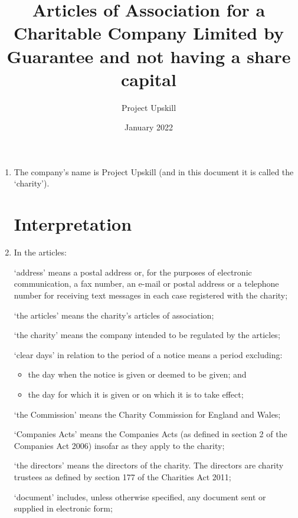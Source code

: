 \documentclass{article}
\title{Articles of Association for a Charitable Company Limited by Guarantee and not having a share capital}
\author{Project Upskill}
\date{January 2022}
\begin{document}
\maketitle
\tableofcontents
\newpage
\begin{enumerate}[label=\arabic*]
    \section{Articles of Association of Project Upskill}
    \item The company's name is Project Upskill (and in this document it is called the `charity').
    
    \section{Interpretation}
    \item In the articles:
    
    `address' means a postal address or, for the purposes of electronic
    communication, a fax number, an e-mail or postal address or a
    telephone number for receiving text messages in each case registered
    with the charity;
    
    `the articles' means the charity's articles of association;
    
    `the charity' means the company intended to be regulated by
    the articles;
    
    `clear days' in relation to the period of a notice means a
    period excluding:
    \begin{itemize}
        \item the day when the notice is given or deemed to be given; and
        \item the day for which it is given or on which it is to take effect;
    \end{itemize}
    
    `the Commission' means the Charity Commission for England and Wales;
    
    `Companies Acts' means the Companies Acts (as defined in section 2 of
    the Companies Act 2006) insofar as they apply to the charity;
    
    `the directors' means the directors of the charity. The directors are
    charity trustees as defined by section 177 of the Charities Act 2011;
    
    `document' includes, unless otherwise specified, any document sent or
    supplied in electronic form;
    

\end{enumerate}
\end{document}
